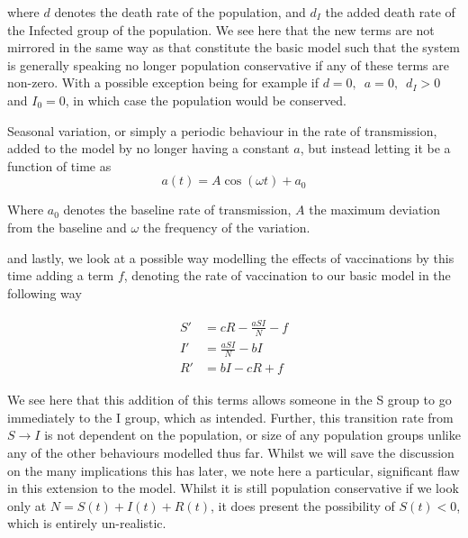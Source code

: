 \documentclass[10pt,showpacs,preprintnumbers,amsmath,amssymb,nofootinbib,aps,prl,twocolumn,groupedaddress,superscriptaddress,showkeys]{revtex4-1}
\begin{document}
    where $d$ denotes the death rate of the population, and $d_I$ the added death rate of the Infected group of the population. We see here that the new terms are not mirrored in the same way as that constitute the basic model such that the system is generally speaking no longer population conservative if any of these terms are non-zero. With a possible exception being for example if $d=0,\enspace a=0,\enspace d_I>0$ and $I_0 = 0$, in which case the population would be conserved.


    Seasonal variation, or simply a periodic behaviour in the rate of transmission, added to the model by no longer having a constant $a$, but instead letting it be a function of time as
    \begin{equation}
      a(t) = A\cos(\omega t) + a_0
      \label{eqn: seavar}
    \end{equation}

    Where $a_0$ denotes the baseline rate of transmission, $A$ the maximum deviation from the baseline and $\omega$ the frequency of the variation. 

    and lastly, we look at a possible way modelling the effects of vaccinations by this time adding a term $f$, denoting the rate of vaccination to our basic model in the following way

    \begin{align}
        \begin{split}
          S' &= cR - \frac{aSI}{N} - f\\
          I' &= \frac{aSI}{N} - bI\\
          R' &= bI - cR + f
        \label{eqn:transition rates, vaxx}
      \end{split}
    \end{align}

    We see here that this addition of this terms allows someone in the S group to go immediately to the I group, which as intended. Further, this transition rate from $S\rightarrow I$ is not dependent on the population, or size of any population groups unlike any of the other behaviours modelled thus far. Whilst we will save the discussion on the many implications this has later, we note here a particular, significant flaw in this extension to the model. Whilst it is still population conservative if we look only at $N = S(t) + I(t) + R(t)$, it does present the possibility of $S(t)<0$, which is entirely un-realistic.
\end{document}
